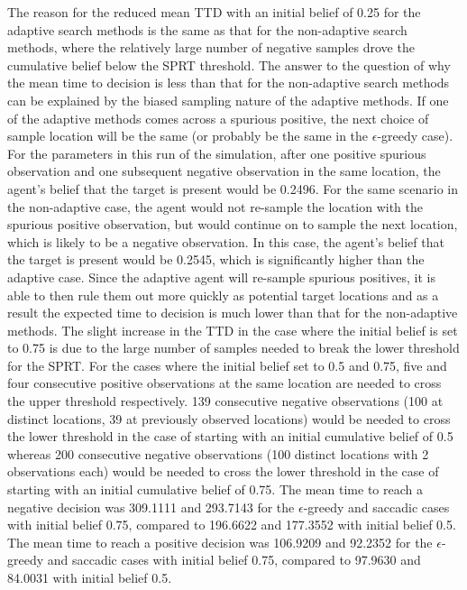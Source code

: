 \begin{itemize}
    The reason for the reduced mean TTD with an initial belief of 0.25 for the adaptive search methods is the same as that for the non-adaptive search methods, where the relatively large number of negative samples drove the cumulative belief below the SPRT threshold. The answer to the question of why the mean time to decision is less than that for the non-adaptive search methods can be explained by the biased sampling nature of the adaptive methods. If one of the adaptive methods comes across a spurious positive, the next choice of sample location will be the same (or probably be the same in the $\epsilon$-greedy case). For the parameters in this run of the simulation, after one positive spurious observation and one subsequent negative observation in the same location, the agent's belief that the target is present would be 0.2496. For the same scenario in the non-adaptive case, the agent would not re-sample the location with the spurious positive observation, but would continue on to sample the next location, which is likely to be a negative observation. In this case, the agent's belief that the target is present would be 0.2545, which is significantly higher than the adaptive case. Since the adaptive agent will re-sample spurious positives, it is able to then rule them out more quickly as potential target locations and as a result the expected time to decision is much lower than that for the non-adaptive methods. The slight increase in the TTD in the case where the initial belief is set to 0.75 is due to the large number of samples needed to break the lower threshold for the SPRT. For the cases where the initial belief set to 0.5 and 0.75, five and four consecutive positive observations at the same location are needed to cross the upper threshold respectively. 139 consecutive negative observations (100 at distinct locations, 39 at previously observed locations) would be needed to cross the lower threshold in the case of starting with an initial cumulative belief of 0.5 whereas 200 consecutive negative observations (100 distinct locations with 2 observations each) would be needed to cross the lower threshold in the case of starting with an initial cumulative belief of 0.75. The mean time to reach a negative decision was 309.1111 and 293.7143 for the $\epsilon$-greedy and saccadic cases with initial belief 0.75, compared to 196.6622 and 177.3552 with initial belief 0.5. The mean time to reach a positive decision was 106.9209 and 92.2352 for the $\epsilon$-greedy and saccadic cases with initial belief 0.75, compared to 97.9630 and 84.0031 with initial belief 0.5. 
\end{itemize}


